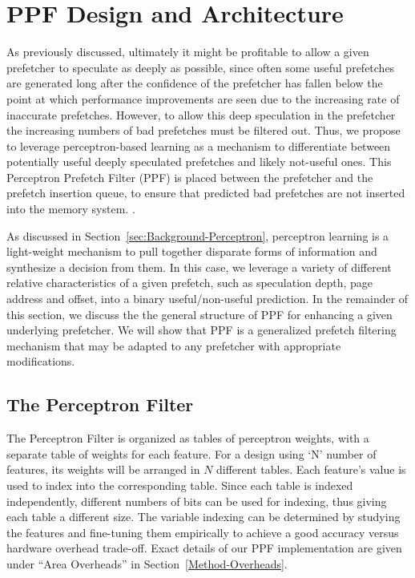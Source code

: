 \section{PPF Design and Architecture}
\label{Arch}

As previously discussed, ultimately it might be profitable to allow a given
prefetcher to speculate as deeply as possible, since often some useful
prefetches are generated long after the confidence of the prefetcher has
fallen below the point at which performance improvements are seen due to the
increasing rate of inaccurate prefetches.  However, to allow this deep
speculation in the prefetcher the increasing numbers of bad prefetches must be
filtered out.  Thus, we propose to leverage perceptron-based learning as a
mechanism to differentiate between potentially useful deeply speculated
prefetches and likely not-useful ones.  This Perceptron Prefetch Filter (PPF)
is placed between the prefetcher and the prefetch insertion queue, to ensure
that predicted bad prefetches are not inserted into the memory system.
.

As discussed in Section~\ref{sec:Background-Perceptron}, perceptron learning
is a light-weight mechanism to pull together disparate forms of information
and synthesize a decision from them.  In this case, we leverage a variety of
different relative characteristics of a given prefetch, such as speculation
depth, page address and offset, into a binary useful/non-useful prediction.
In the remainder of this section, we discuss the the general structure of PPF
for enhancing a given underlying prefetcher.  We will show that PPF is a
generalized prefetch filtering mechanism that may be adapted to any prefetcher
with appropriate modifications.


\subsection{The Perceptron Filter}
\label{Arch-Perceptron}

The Perceptron Filter is organized as tables of perceptron weights, with a
separate table of weights for each feature. For a design using `N' number of
features, its weights will be arranged in $N$ different tables. Each feature's
value is used to index into the corresponding table.  Since each table is
indexed independently, different numbers of bits can be used for indexing,
thus giving each table a different size.  The variable indexing can be
determined by studying the features and fine-tuning them empirically to
achieve a good accuracy versus hardware overhead trade-off.  Exact details of
our PPF implementation are given under ``Area Overheads'' in
Section~\ref{Method-Overheads}.

